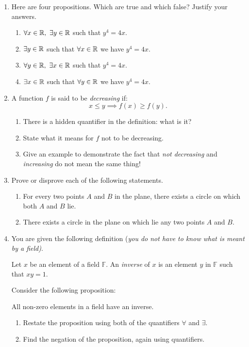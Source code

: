 \begin{exercises}{}{}
\begin{enumerate}
	\item Here are four propositions. Which are true and which false? Justify your answers.
	\begin{enumerate}
	  \item $\forall x\in\mathbb{R},\ \exists y\in\mathbb{R}$ such that $y^4=4x$.
	  \item $\exists y\in\mathbb{R}$ such that $\forall x\in\mathbb{R}$ we have $y^4=4x$.
	  \item $\forall y\in\mathbb{R},\ \exists x\in\mathbb{R}$ such that $y^4=4x$.
	  \item $\exists x\in\mathbb{R}$ such that $\forall y\in\mathbb{R}$ we have $y^4=4x$.
	\end{enumerate}
	
	
	\item\label{ex:decreasing} A function $f$ is said to be \emph{decreasing} if:
	\[x\le y\implies f(x)\ge f(y).\]
	\begin{enumerate}
	  \item There is a hidden quantifier in the definition: what is it?
	  \item State what it means for $f$ not to be decreasing.
	  \item Give an example to demonstrate the fact that \emph{not decreasing} and \emph{increasing} do not mean the same thing!
	\end{enumerate}
	
	\item Prove or disprove each of the following statements.
	\begin{enumerate}
	  \item For every two points $A$ and $B$ in the plane, there exists a circle on which both $A$ and $B$ lie.
	  \item There exists a circle in the plane on which lie any two points $A$ and $B$.
	\end{enumerate}
  
	\item You are given the following definition (\emph{you do not have to know what is meant by a field)}.
	\begin{center}
	Let $x$ be an element of a field $\mathbb{F}$. An \emph{inverse} of $x$ is an element $y$ in $\mathbb{F}$ such that $xy=1$.
	\end{center}
	Consider the following proposition:
	\begin{center}
	All non-zero elements in a field have an inverse.
	\end{center}
	\begin{enumerate}
	  \item Restate the proposition using both of the quantifiers $\forall$ and $\exists$.
	  \item Find the negation of the proposition, again using quantifiers.
	\end{enumerate}\goodbreak
	

\end{enumerate}
\end{exercises}
